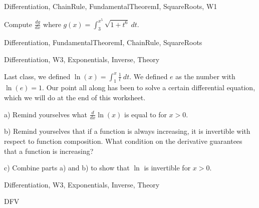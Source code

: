 
\begin{tagblock}{Differentiation, ChainRule, FundamentalTheoremI, SquareRoots, W1}
\begin{question}
	Compute $\displaystyle\frac {dg}{dx}$ where $\displaystyle g(x)=\int_3^{x^5}\sqrt{1+t^6} \ dt$.
	
	
\begin{tags}
	    Differentiation, FundamentalTheoremI, ChainRule, SquareRoots
\end{tags}
	
\begin{diary}
\end{diary}
	
\begin{solution}
	   
\end{solution}
	
\end{question}

\end{tagblock}


\begin{tagblock}{Differentiation, W3, Exponentials, Inverse, Theory}
\begin{question}
	Last class, we defined $\ln(x)=\displaystyle\int^x_1 \frac 1 t \ dt$. We defined $e$ as the number with $\ln(e)=1$. Our point all along has been to solve a certain differential equation, which we will do at the end of this worksheet. 

\bigskip
a) Remind yourselves what $\displaystyle\frac d {dx}\ln(x)$ is equal to for $x>0$. 

\bigskip

b) Remind yourselves that if a function is always increasing, it is invertible with respect to function composition. What condition on the derivative guarantees that a function is increasing?

\bigskip
                
c) Combine parts a) and b) to show that $\ln$ is invertible for $x>0$.


	
	
\begin{tags}
	    Differentiation, W3, Exponentials, Inverse, Theory
\end{tags}
	
\begin{diary}DFV            
\end{diary}
	
\begin{solution}
	   
\end{solution}
	
\end{question}

\end{tagblock}

